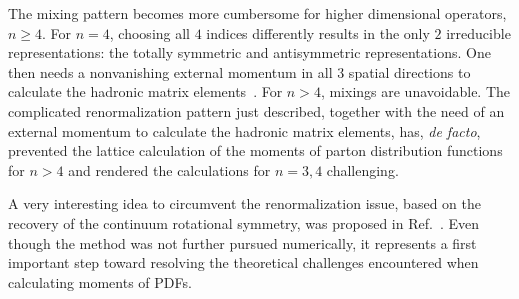 The mixing pattern becomes more cumbersome for higher dimensional
operators, $n \ge 4$. For $n=4$, choosing
all $4$ indices differently results in the only $2$ irreducible
representations: the totally symmetric and antisymmetric representations.
One then needs a nonvanishing external momentum in all $3$ spatial directions
to calculate the hadronic matrix elements~\cite{Beccarini:1995iv}.
For $n > 4$, mixings are unavoidable.
The complicated renormalization pattern just described,
together with the need of an external momentum to calculate
the hadronic matrix elements, has, {\it de facto}, prevented the lattice calculation
of the moments of parton distribution functions for $n>4$ and rendered the calculations
for $n=3,4$ challenging.

A very interesting idea to circumvent the renormalization issue,
based on the recovery of the continuum rotational symmetry,
was proposed in Ref.~\cite{Davoudi:2012ya}.
Even though the method was not further pursued numerically,
it represents a first important step toward resolving
the theoretical challenges encountered when calculating moments of PDFs.
